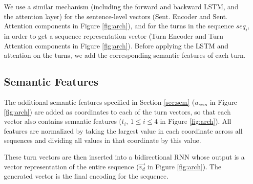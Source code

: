 We use a similar mechanism (including the forward and backward 
LSTM, and the attention layer) for the sentence-level vectors (Sent. Encoder and Sent. Attention components in Figure \ref{fig:arch}), 
and for the turns in the sequence $seq_i$, in order to get a sequence representation vector 
(Turn Encoder and Turn Attention components in Figure \ref{fig:arch}). 
Before applying the LSTM and attention on the turns, we add the corresponding semantic features 
of each turn. 

\subsection{Semantic Features}
The additional semantic features specified 
in Section \ref{sec:sem} ($u_{sem}$ in Figure \ref{fig:arch})
are added as coordinates to each of the turn vectors, 
so that each vector also contains semantic features  ($t_i$, $1\leq i \leq 4$ in Figure \ref{fig:arch}). 
All features are normalized by taking the largest 
value in each coordinate across all sequences and dividing 
all values in that coordinate by this value. 

These turn vectors are then inserted into a bidirectional RNN whose output 
is a vector representation of the entire sequence ($\vec{v_d}$ in Figure \ref{fig:arch}). 
The generated vector is the final encoding for the sequence.








